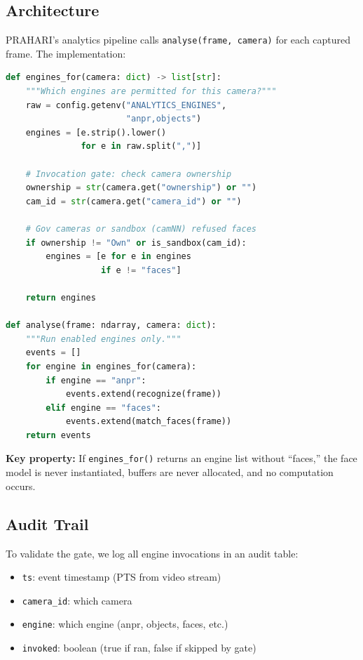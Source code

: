 \documentclass[sigplan,review]{acmart}
\begin{document}
\subsection{Architecture}

PRAHARI's analytics pipeline calls \texttt{analyse(frame, camera)} for each captured frame.
The implementation:

\begin{lstlisting}[language=Python]
def engines_for(camera: dict) -> list[str]:
    """Which engines are permitted for this camera?"""
    raw = config.getenv("ANALYTICS_ENGINES", 
                        "anpr,objects")
    engines = [e.strip().lower() 
               for e in raw.split(",")]
    
    # Invocation gate: check camera ownership
    ownership = str(camera.get("ownership") or "")
    cam_id = str(camera.get("camera_id") or "")
    
    # Gov cameras or sandbox (camNN) refused faces
    if ownership != "Own" or is_sandbox(cam_id):
        engines = [e for e in engines 
                   if e != "faces"]
    
    return engines

def analyse(frame: ndarray, camera: dict):
    """Run enabled engines only."""
    events = []
    for engine in engines_for(camera):
        if engine == "anpr":
            events.extend(recognize(frame))
        elif engine == "faces":
            events.extend(match_faces(frame))
    return events
\end{lstlisting}

\textbf{Key property:} If \texttt{engines\_for()} returns an engine list without ``faces,'' the face
model is never instantiated, buffers are never allocated, and no computation occurs.

\subsection{Audit Trail}

To validate the gate, we log all engine invocations in an audit table:
\begin{itemize}
  \item \texttt{ts}: event timestamp (PTS from video stream)
  \item \texttt{camera\_id}: which camera
  \item \texttt{engine}: which engine (anpr, objects, faces, etc.)
  \item \texttt{invoked}: boolean (true if ran, false if skipped by gate)
\end{itemize}
\end{document}
